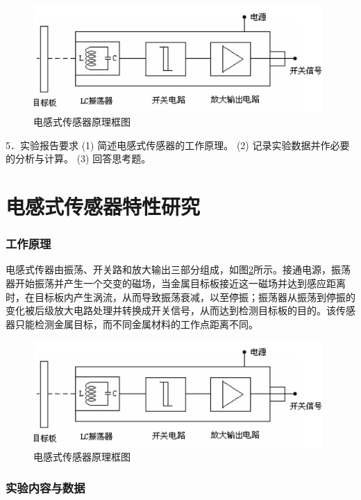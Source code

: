 \tableofcontents
\clearpage



\begin{figure}[htbp]
\centering
\includegraphics[width=11cm]{resource/principle.png}
\caption{电感式传感器原理框图}
\label{fig:sp}
\end{figure}

5．实验报告要求
(1) 简述电感式传感器的工作原理。
(2) 记录实验数据并作必要的分析与计算。
(3) 回答思考题。

\part{电感式传感器特性研究}
\section{工作原理}
电感式传器由振荡、开关路和放大输出三部分组成，如图\ref{fig:sp}所示。接通电源，振荡器开始振荡并产生一个交变的磁场，当金属目标板接近这一磁场并达到感应距离时，在目标板内产生涡流，从而导致振荡衰减，以至停振；振荡器从振荡到停振的变化被后级放大电路处理并转换成开关信号，从而达到检测目标板的目的。该传感器只能检测金属目标，而不同金属材料的工作点距离不同。
\begin{figure}[htbp]
\centering
\includegraphics[width=11cm]{resource/principle.png}
\caption{电感式传感器原理框图}
\label{fig:sp}
\end{figure}

\section{实验内容与数据}
